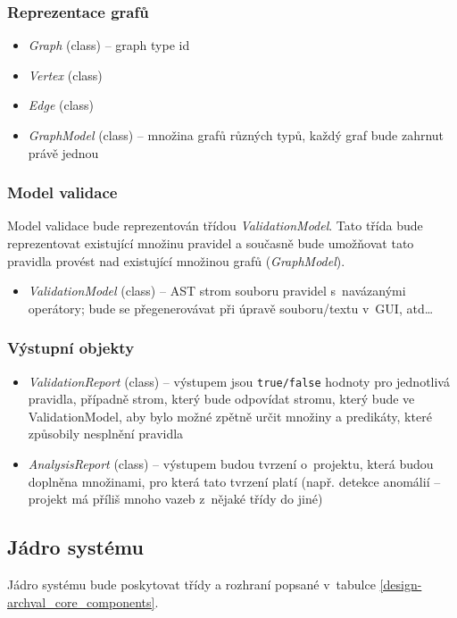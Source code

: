 \subsubsection{Reprezentace grafů}
\begin{itemize}
\item \emph{Graph} (class) -- graph type id
\item \emph{Vertex} (class)
\item \emph{Edge} (class)
\item \emph{GraphModel} (class) -- množina grafů různých typů, každý graf bude zahrnut právě jednou
\end{itemize}

\subsubsection{Model validace}
Model validace bude reprezentován třídou \emph{ValidationModel}. Tato třída bude reprezentovat existující množinu pravidel a současně bude umožňovat tato pravidla provést nad existující množinou grafů (\emph{GraphModel}).
\begin{itemize}
\item \emph{ValidationModel} (class) -- AST strom souboru pravidel s~navázanými operátory; bude se přegenerovávat při úpravě souboru/textu v~GUI, atd\ldots
\end{itemize}

\subsubsection{Výstupní objekty}
\begin{itemize}
\item \emph{ValidationReport} (class) -- výstupem jsou \verb+true/false+ hodnoty pro jednotlivá pravidla, případně strom, který bude odpovídat stromu, který bude ve ValidationModel, aby bylo možné zpětně určit množiny a predikáty, které způsobily nesplnění pravidla
\item \emph{AnalysisReport} (class) -- výstupem budou tvrzení o~projektu, která budou doplněna množinami, pro která tato tvrzení platí (např. detekce anomálií -- projekt má příliš mnoho vazeb z~nějaké třídy do jiné)
\end{itemize}

\subsection{Jádro systému}
Jádro systému bude poskytovat třídy a rozhraní popsané v~tabulce \ref{design-archval_core_components}.

